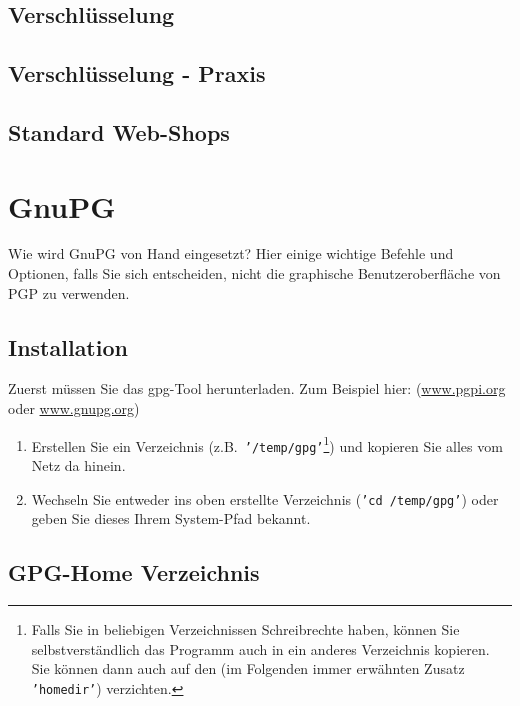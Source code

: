 \subsection{Verschlüsselung}

\subsection{Verschlüsselung - Praxis}

\subsection{Standard Web-Shops}

\section{GnuPG}
\label{sec:gnupg}

Wie wird GnuPG von Hand eingesetzt? Hier einige wichtige Befehle und Optionen,
falls Sie sich entscheiden, nicht die graphische Benutzeroberfläche von PGP zu verwenden.

\subsection{Installation}
\label{subsec:gnupg-installation}

Zuerst müssen Sie das gpg-Tool herunterladen. Zum Beispiel hier: (\href{https://www.openpgp.org}{www.pgpi.org} oder
\href{https://www.gnupg.org}{www.gnupg.org})

\begin{enumerate}
    \item Erstellen Sie ein Verzeichnis (z.B.~\texttt{'/temp/gpg'}\footnote{Falls Sie in
    beliebigen Verzeichnissen Schreibrechte haben, können Sie selbstverständlich das
    Programm auch in ein anderes Verzeichnis kopieren. Sie können dann auch auf den
    (im Folgenden immer erwähnten Zusatz \texttt{'homedir'}) verzichten.}) und kopieren
    Sie alles vom Netz da hinein.

    \item Wechseln Sie entweder ins oben erstellte Verzeichnis (\texttt{'cd /temp/gpg'})
    oder geben Sie dieses Ihrem System-Pfad bekannt.

\end{enumerate}

\subsection{GPG-Home Verzeichnis}
\label{subsec:gpg-home}

